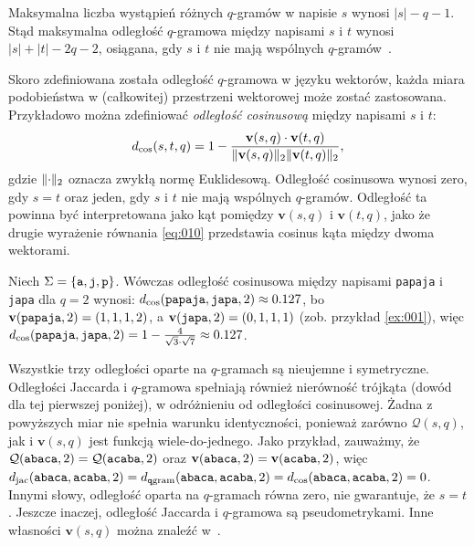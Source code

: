 \documentclass{praca1}
\DeclarePairedDelimiter{\norm}{\lVert}{\rVert}
\begin{document}

Maksymalna liczba wystąpień różnych $q$-gramów w napisie $s$ wynosi $|s| - q - 1$. Stąd maksymalna odległość $q$-gramowa między napisami $s$ i $t$ wynosi $|s| + |t| - 2q - 2$, osiągana, gdy $s$ i $t$ nie mają wspólnych $q$-gramów~\cite{Loo2014:stringdist}.

Skoro zdefiniowana została odległość $q$-gramowa w języku wektorów, każda miara podobieństwa w (całkowitej) przestrzeni wektorowej może zostać zastosowana. Przykładowo można zdefiniować \emph{odległość cosinusową} między napisami $s$ i $t$:
\begin{equation}
\label{eq:010}
d_{\mathrm{cos}}(s,t,q) = 1 - \frac{ \mathbf{v}(s,q) \cdot \mathbf{v}(t,q) }{ \norm{\mathbf{v}(s,q)}_2  \norm{\mathbf{v}(t,q)}_2 },
\end{equation}
gdzie $\norm{\cdot}_2$ oznacza zwykłą normę Euklidesową. Odległość cosinusowa wynosi zero, gdy $s=t$ oraz jeden, gdy $s$ i $t$ nie mają wspólnych $q$-gramów. Odległość ta powinna być interpretowana jako kąt pomiędzy $\mathbf{v}(s,q)$ i $\mathbf{v}(t,q)$, jako że drugie wyrażenie równania \eqref{eq:010} przedstawia cosinus kąta między dwoma wektorami.

\begin{example}
Niech $\Sigma = \{\verb|a|, \verb|j|, \verb|p|\}$. Wówczas odległość cosinusowa między napisami \verb|papaja| i \verb|japa| dla $q = 2$ wynosi: $d_{\mathrm{cos}}(\verb|papaja|, \verb|japa|, 2) \approx 0.127$, bo $\mathbf{v}( \verb|papaja|,2) = (1, 1, 1, 2)$, a  $\mathbf{v}( \verb|japa|,2) = (0, 1, 1, 1)$ (zob. przykład \ref{ex:001}), więc $d_{\mathrm{cos}}(\verb|papaja|, \verb|japa|, 2) = 1 - \frac{4}{\sqrt{3}\cdot\sqrt{7}} \approx 0.127$.
\end{example}

Wszystkie trzy odległości oparte na $q$-gramach są nieujemne i symetryczne. Odległości Jaccarda i $q$-gramowa spełniają również nierówność trójkąta (dowód dla tej pierwszej poniżej), w odróżnieniu od odległości cosinusowej. Żadna z powyższych miar nie spełnia warunku identyczności, ponieważ zarówno $\mathcal{Q}(s,q)$, jak i $\mathbf{v}(s,q)$ jest funkcją wiele-do-jednego. Jako przykład, zauważmy, że $\mathcal{Q}(\verb|abaca|,2) = \mathcal{Q}(\verb|acaba|,2)$ oraz $\mathbf{v}(\verb|abaca|,2) = \mathbf{v}(\verb|acaba|,2)$, więc $d_{\mathrm{jac}}(\verb|abaca|, \verb|acaba|, 2) = d_{\mathtt{q}\mathrm{gram}}(\verb|abaca|, \verb|acaba|, 2) = d_{\mathrm{cos}}(\verb|abaca|, \verb|acaba|, 2) = 0$. Innymi słowy, odległość oparta na $q$-gramach równa zero, nie gwarantuje, że $s = t$. Jeszcze inaczej, odległość Jaccarda i $q$-gramowa są pseudometrykami. Inne własności $\mathbf{v}(s,q)$ można znaleźć w~\cite{Ukkonen1992:approxqgrams}.
\end{document}
